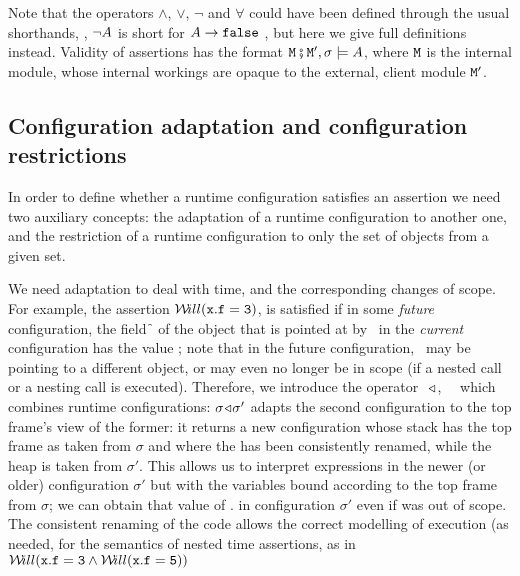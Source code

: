 Note that the operators $\wedge$, $\vee$,  $\neg$ and $\forall$  could have been defined  through the usual shorthands, \eg, $\neg A$ is short for
$A \rightarrow {\mbox{\tt{false}}}$ \etc, but here we give full definitions instead.
 Validity of assertions has the format ${\mbox{\tt{\ensuremath{{\mbox{\tt{M}}}}}}}\fatsemi {\mbox{\tt{\ensuremath{{\mbox{\tt{M}}}}}}}', \sigma \models A$, where  ${\mbox{\tt{\ensuremath{{\mbox{\tt{M}}}}}}}$ is the internal module, whose internal workings
 are opaque to the external, client module ${\mbox{\tt{\ensuremath{{\mbox{\tt{M}}}}}}}'$.

\subsection{Configuration adaptation and configuration restrictions}
In order to define whether a runtime configuration satisfies an assertion we need two auxiliary concepts:
the adaptation of a runtime configuration to another one, and the restriction of a runtime configuration to only the set of objects from a
given set.

We need adaptation to deal with time, and the corresponding changes of scope. For example, the assertion
${{\mathcal W}\!ill}({\mbox{\tt{x}}}.{\mbox{\tt{f}}}={\mbox{\tt{3}}})$, is satisfied if in some {\em future} configuration, the field  \f\, of the object that is pointed at by \x\, in the {\em current} configuration has the value ; note that in the future  configuration, \x\, may be pointing to a different object, or may
even no longer be in scope (\eg if a nested call or a nesting call is executed).
Therefore, we introduce the operator \  $\!\triangleleft\!\;$,  \ \ which combines runtime configurations: $\sigma \!\triangleleft\! \sigma'$ adapts the second configuration to the top frame's view of the former: it returns a new configuration whose stack has  the top frame as taken from $\sigma$ and where the  has been consistently renamed, while the heap is taken from $\sigma'$. This allows us to interpret expressions  in the newer (or older) configuration $\sigma'$ but with the variables bound according to the top frame from $\sigma$; \eg we can obtain that value of . in configuration  $\sigma'$ even if  was out of scope. The consistent renaming of the code allows the correct modelling of execution (as needed,   for the semantics of  nested time assertions, as \eg in ${{\mathcal W}\!ill}({\mbox{\tt{x}}}.{\mbox{\tt{f}}}={\mbox{\tt{3}}} \wedge {{\mathcal W}\!ill}({\mbox{\tt{x}}}.{\mbox{\tt{f}}}={\mbox{\tt{5}}}))$


